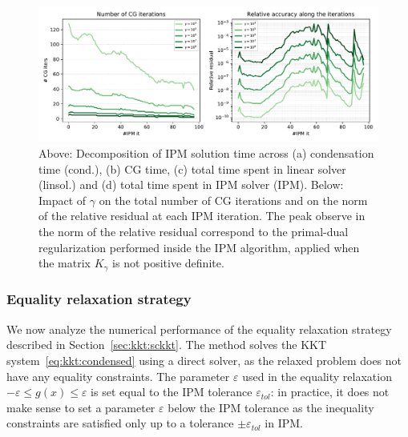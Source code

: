 \begin{figure}[!ht]
  \centering
  \includegraphics[width=\textwidth]{../figures/hybrid-gamma.pdf}
  \caption{
    Above: Decomposition of IPM solution time across
    (a) condensation time (cond.), (b) CG time, (c) total time
    spent in linear solver (linsol.) and (d) total time spent in
    IPM solver (IPM).
    Below: Impact of $\gamma$ on the total number of CG iterations
    and on the norm of the relative residual at each IPM iteration.
    The peak observe in the norm of the relative residual correspond
    to the primal-dual regularization performed inside the IPM algorithm,
    applied when the matrix $K_\gamma$ is not positive definite.
    \label{fig:hybrid:gamma}
  }
\end{figure}



\subsubsection{Equality relaxation strategy}
We now analyze the numerical performance of the equality relaxation strategy described in
Section~\ref{sec:kkt:sckkt}. The method solves the KKT system~\eqref{eq:kkt:condensed}
using a direct solver, as the relaxed problem does not have any equality constraints.
The parameter $\varepsilon$ used in the equality relaxation $-\varepsilon \leq g(x) \leq \varepsilon$
is set equal to the IPM tolerance $\varepsilon_{tol}$: in practice, it does not
make sense to set a parameter $\varepsilon$ below the IPM tolerance as the
inequality constraints are satisfied only up to a tolerance $\pm \varepsilon_{tol}$
in IPM.

